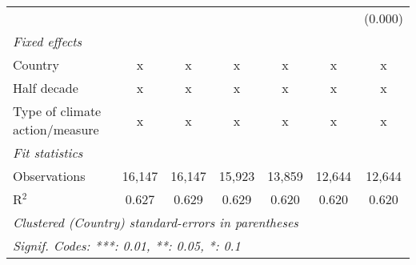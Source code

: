 \begin{tabular}{lcccccc}
                                               &               &               &              &               &               & (0.000)\\   
   \emph{Fixed effects}\\
   Country                                     & x             & x             & x            & x             & x             & x\\  
   Half decade                                 & x             & x             & x            & x             & x             & x\\  
   Type of climate action/measure              & x             & x             & x            & x             & x             & x\\  
   \midrule \emph{Fit statistics}\\
   Observations                                & 16,147        & 16,147        & 15,923       & 13,859        & 12,644        & 12,644\\  
   R$^2$                                       & 0.627         & 0.629         & 0.629        & 0.620         & 0.620         & 0.620\\  
   \midrule
   \multicolumn{7}{l}{\emph{Clustered (Country) standard-errors in parentheses}}\\
   \multicolumn{7}{l}{\emph{Signif. Codes: ***: 0.01, **: 0.05, *: 0.1}}\\
\end{tabular}
\par\endgroup


